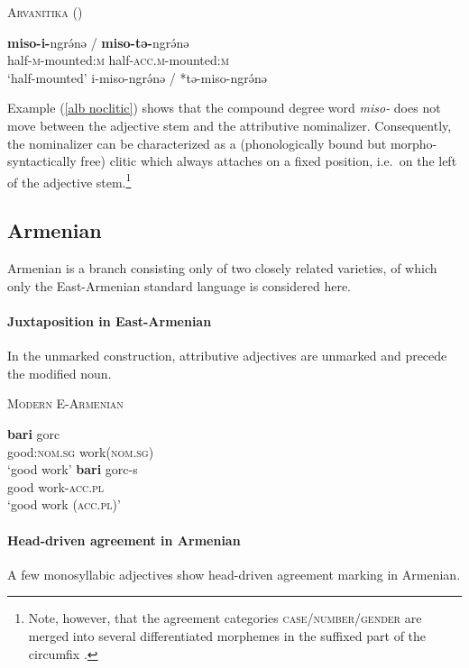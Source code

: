 \begin{exe}
\ex \textsc{Arvanitika} (\citealt[304]{sasse1991}) \label{alb noclitic}
\begin{xlist}
\ex
\gll	\textbf{miso-i-}ngrə́nə /\- \textbf{miso-tə-}ngrə́nə\\
	half-\textsc{m}-mounted:\textsc{m} { } half-\textsc{acc.m}-mounted:\textsc{m}\\
\glt	‘half-mounted’
\ex	*i-miso-ngrə́nə /\- *tə-miso-ngrə́nə
\end{xlist}
\end{exe}
Example (\ref{alb noclitic}) shows that the compound degree word {\it miso-} does not move between the adjective stem and the attributive nominalizer. Consequently, the nominalizer can be characterized as a (phonologically bound but morpho-syntactically free) clitic which always attaches on a fixed position, i.e.~on the left of the adjective stem.\footnote{Note, however, that the agreement categories \textsc{case/\-number/\-gender} are merged into several differentiated morphemes in the suffixed part of the circumfix \cite[124–128]{sasse1991}.}

\subsection{Armenian}
Armenian is a branch consisting only of two closely related varieties, of which only the East-Armenian standard language is considered here.

\paragraph{Juxtaposition in East-Armenian} 
In the unmarked construction, attributive adjectives are unmarked and precede the modified noun.
\begin{exe}
\ex \textsc{Modern E-Armenian} \citep{ajello1998}
\begin{xlist}
\ex 
\gll	\textbf{bari} gorc\\
	good:\textsc{nom.sg} work(\textsc{nom.sg})\\
\glt	‘good work’
\ex 
\gll	\textbf{bari} gorc-s\\
	good work-\textsc{acc.pl}\\
\glt	‘good work (\textsc{acc.pl})’
\end{xlist}
\end{exe}

\paragraph{Head-driven agreement in Armenian}
A few monosyllabic adjectives show head-driven agreement marking in Armenian. 

